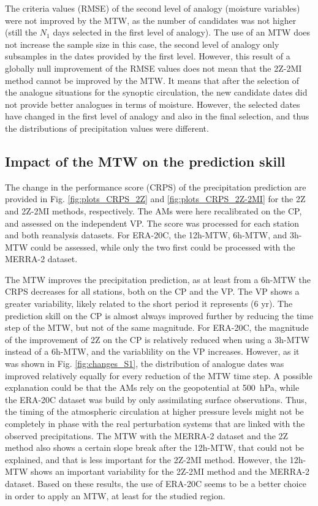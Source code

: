 \documentclass[hess, manuscript]{copernicus}
\begin{document}
	The criteria values (RMSE) of the second level of analogy (moisture variables) were not improved by the MTW, as the number of candidates was not higher (still the $N_{1}$ days selected in the first level of analogy). The use of an MTW does not increase the sample size in this case, the second level of analogy only subsamples in the dates provided by the first level. However, this result of a globally null improvement of the RMSE values does not mean that the 2Z-2MI method cannot be improved by the MTW. It means that after the selection of the analogue situations for the synoptic circulation, the new candidate dates did not provide better analogues in terms of moisture. However, the selected dates have changed in the first level of analogy and also in the final selection, and thus the distributions of precipitation values were different.
	
	
	\subsection{Impact of the MTW on the prediction skill}
	\label{sec:influence_scores}
	
	The change in the performance score (CRPS) of the precipitation prediction are provided in Fig. \ref{fig:plots_CRPS_2Z} and \ref{fig:plots_CRPS_2Z-2MI} for the 2Z and 2Z-2MI methods, respectively. The AMs were here recalibrated on the CP, and assessed on the independent VP. The score was processed for each station and both reanalysis datasets. For ERA-20C, the 12h-MTW, 6h-MTW, and 3h-MTW could be assessed, while only the two first could be processed with the MERRA-2 dataset.
	
	The MTW improves the precipitation prediction, as at least from a 6h-MTW the CRPS decreases for all stations, both on the CP and the VP. The VP shows a greater variability, likely related to the short period it represents (6 yr). The prediction skill on the CP is almost always improved further by reducing the time step of the MTW, but not of the same magnitude. For ERA-20C, the magnitude of the improvement of 2Z on the CP is relatively reduced when using a 3h-MTW instead of a 6h-MTW, and the variablility on the VP increases. However, as it was shown in Fig. \ref{fig:changes_S1}, the distribution of analogue dates was improved relatively equally for every reduction of the MTW time step. A possible explanation could be that the AMs rely on the geopotential at 500~hPa, while the ERA-20C dataset was build by only assimilating surface observations. Thus, the timing of the atmospheric circulation at higher pressure levels might not be completely in phase with the real perturbation systems that are linked with the observed precipitations. The MTW with the MERRA-2 dataset and the 2Z method also shows a certain slope break after the 12h-MTW, that could not be explained, and that is less important for the 2Z-2MI method. However, the 12h-MTW shows an important variability for the 2Z-2MI method and the MERRA-2 dataset. Based on these results, the use of ERA-20C seems to be a better choice in order to apply an MTW, at least for the studied region.
	
\end{document}
